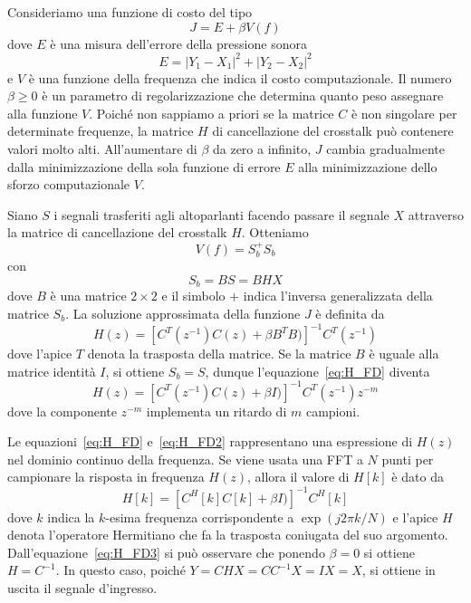 \documentclass[12pt,a4paper,titlepage]{article}
\begin{document}
Consideriamo una funzione di costo del tipo
\begin{equation}\label{funzione_costo_fd}
J = E + \beta V(f)
\end{equation}
dove $E$ è una misura dell'errore della pressione sonora
\begin{equation}\label{errore_fd}
E = | Y_1 - X_1 |^2  + | Y_2 - X_2 |^2
\end{equation}
e $V$ è una funzione della frequenza che indica il costo computazionale. Il numero $\beta \geq 0$ è un parametro di regolarizzazione che determina quanto peso
assegnare alla funzione $V$. Poiché non sappiamo a priori se la matrice $C$ è non singolare per determinate frequenze, la matrice $H$ di cancellazione del crosstalk può contenere valori molto alti. All'aumentare di $\beta$ da zero a infinito, $J$ cambia gradualmente dalla minimizzazione della sola funzione di errore $E$ alla minimizzazione dello sforzo computazionale $V$.

Siano $S$ i segnali trasferiti agli altoparlanti facendo passare il segnale $X$ attraverso la matrice di cancellazione del crosstalk $H$. Otteniamo
\begin{equation}
V(f) = S_b ^{+} S_b
\end{equation}
con
\begin{equation}
S_b = BS = BHX
\end{equation}
dove $B$ è una matrice $2 \times 2$ e il simbolo $+$ indica l'inversa generalizzata della matrice $S_b$. La soluzione approssimata della funzione $J$ è definita da 
\begin{equation}\label{eq:H_FD}
H(z) = \left[C^T (z^{-1}) C(z) + \beta B^T B)\right]^{-1} C^T(z^{-1})
\end{equation}
dove l'apice $T$ denota la trasposta della matrice. Se la matrice $B$ è uguale alla matrice identità $I$, si ottiene $S_b = S$, dunque l'equazione~\eqref{eq:H_FD} diventa
\begin{equation}\label{eq:H_FD2}
H(z) = \left[C^T (z^{-1}) C(z) + \beta I)\right]^{-1} C^T(z^{-1}) z^{-m}
\end{equation}
dove la componente $z^{-m}$ implementa un ritardo di $m$ campioni.

Le equazioni~\eqref{eq:H_FD} e~\eqref{eq:H_FD2} rappresentano una espressione di $H(z)$ nel dominio continuo della frequenza. Se viene usata una FFT a $N$ punti per campionare la risposta in frequenza $H(z)$, allora il valore di $H[k]$ è dato da
\begin{equation}\label{eq:H_FD3}
H[k] = \left[C^H[k] C[k] + \beta I)\right]^{-1} C^H[k]
\end{equation}
dove $k$ indica la $k$-esima frequenza corrispondente a $\exp(j2\pi k/N)$ e l'apice $H$ denota l'operatore Hermitiano che fa la trasposta coniugata del suo argomento. Dall'equazione~\eqref{eq:H_FD3} si può osservare che ponendo $\beta = 0$ si ottiene $H = C^{-1}$. In questo caso, poiché $Y = CHX = C C^{-1} X = IX = X$, si ottiene in uscita il segnale d'ingresso.
\end{document}

